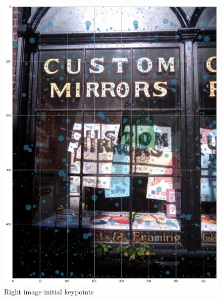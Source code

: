 \documentclass[]{article}
\begin{document}
\begin{figure}[htb]
	\centering
	\includegraphics[width=\linewidth]{CustomMirrorsRightStep1}
	\caption{Right image initial keypoints}
	\label{custommirrorsrightstep1}
\end{figure}
\end{document}
